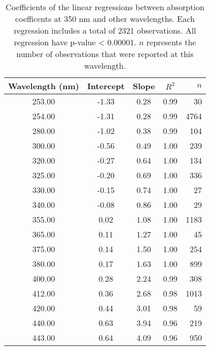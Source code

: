 \begin{table}[ht]
\centering
\begin{tabular}{ccccr}
  \hline
Wavelength (nm) & Intercept & Slope & $R^2$ & $n$ \\ 
  \hline
253.00 & -1.33 & 0.28 & 0.99 &  30 \\ 
  254.00 & -1.31 & 0.28 & 0.99 & 4764 \\ 
  280.00 & -1.02 & 0.38 & 0.99 & 104 \\ 
  300.00 & -0.56 & 0.49 & 1.00 & 239 \\ 
  320.00 & -0.27 & 0.64 & 1.00 & 134 \\ 
  325.00 & -0.20 & 0.69 & 1.00 & 336 \\ 
  330.00 & -0.15 & 0.74 & 1.00 &  27 \\ 
  340.00 & -0.08 & 0.86 & 1.00 &  29 \\ 
  355.00 & 0.02 & 1.08 & 1.00 & 1183 \\ 
  365.00 & 0.11 & 1.27 & 1.00 &  45 \\ 
  375.00 & 0.14 & 1.50 & 1.00 & 254 \\ 
  380.00 & 0.17 & 1.63 & 1.00 & 899 \\ 
  400.00 & 0.28 & 2.24 & 0.99 & 308 \\ 
  412.00 & 0.36 & 2.68 & 0.98 & 1013 \\ 
  420.00 & 0.44 & 3.01 & 0.98 &  59 \\ 
  440.00 & 0.63 & 3.94 & 0.96 & 219 \\ 
  443.00 & 0.64 & 4.09 & 0.96 & 950 \\ 
   \hline
\end{tabular}
\caption{Coefficients of the linear regressions between absorption 
coefficents at 350 nm and other wavelengths. Each regression includes a total 
of 2321 observations. All regression have p-value < 0.00001.  $n$ represents 
the number of observations that were reported at this wavelength.} 
\end{table}
